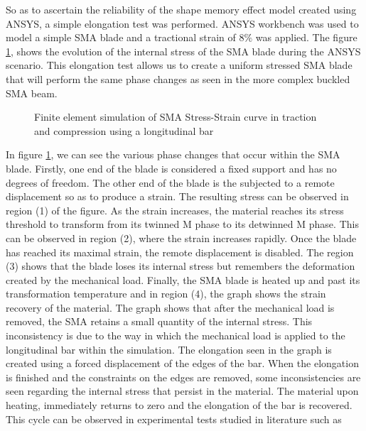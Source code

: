 So as to ascertain the reliability of the shape memory effect model created using ANSYS, a simple elongation test was performed. ANSYS workbench was used to model a simple SMA blade and a tractional strain of 8$\%$ was applied. The figure \ref{fig:FigElongationStressStrain}, shows the evolution of the internal stress of the SMA blade during the ANSYS scenario. This elongation test allows us to create a uniform stressed SMA blade that will perform the same phase changes as seen in the more complex buckled SMA beam.

\begin{figure}[ht]
	\centering
  {\footnotesize
	\def\svgwidth{0.5\textwidth}
	
  }
	\caption{Finite element simulation of SMA Stress-Strain curve in traction and compression using a longitudinal bar}
	\label{fig:FigElongationStressStrain}
\end{figure}

In figure \ref{fig:FigElongationStressStrain}, we can see the various phase changes that occur within the SMA blade. Firstly, one end of the blade is considered a fixed support and has no degrees of freedom. The other end of the blade is the subjected to a remote displacement so as to produce a strain. The resulting stress can be observed in region (1) of the figure. As the strain increases, the material reaches its stress threshold to transform from its twinned M phase to its detwinned M phase. This can be observed in region (2), where the strain increases rapidly. Once the blade has reached its maximal strain, the remote displacement is disabled. The region (3) shows that the blade loses its internal stress but remembers the deformation created by the mechanical load. Finally, the SMA blade is heated up and past its transformation temperature and in region (4), the graph shows the strain recovery of the material. The graph shows that after the mechanical load is removed, the SMA retains a small quantity of the internal stress. This inconsistency is due to the way in which the mechanical load is applied to the longitudinal bar within the simulation. The elongation seen in the graph is created using a forced displacement of the edges of the bar. When the elongation is finished and the constraints on the edges are removed, some inconsistencies are seen regarding the internal stress that persist in the material. The material upon heating, immediately returns to zero and the elongation of the bar is recovered. This cycle can be observed in experimental tests studied in literature such as \cite{hongchun_xie_design_2007, liu_asymmetry_1998}

